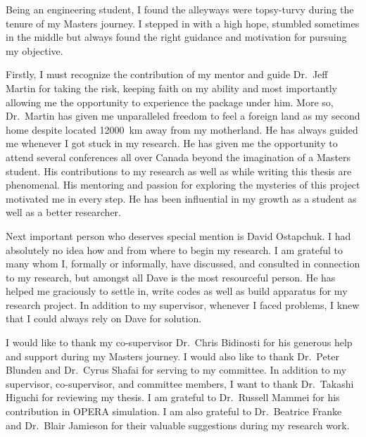 \newpage
\tableofcontents
{}
\listoffigures
\listoftables

\begin{acknowledgments}
\vspace{2em}

Being an engineering student, I found the alleyways were topsy-turvy during the tenure of my Masters journey. I stepped in with a high hope, stumbled sometimes in the middle but always found the right guidance and motivation for pursuing my objective. 

Firstly, I must recognize the contribution of my mentor and guide Dr.~Jeff Martin for taking the risk, keeping faith on my ability and most importantly allowing me the opportunity to experience the package under him. More so, Dr.~Martin has given me unparalleled freedom to feel a foreign land as my second home despite located 12000~km away from my motherland. He has always guided me whenever I got stuck in my research. He has given me the opportunity to attend several conferences all over Canada beyond the imagination of a Masters student. His contributions to my research as well as while writing this thesis are phenomenal. His mentoring and passion for exploring the mysteries of this project motivated me in every step. He has been influential in my growth as a student as well as a better researcher.  



Next important person who deserves special mention is David Ostapchuk. I had absolutely no idea how and from where to begin my research. I am grateful to many whom I, formally or informally, have discussed, and consulted in connection to my research, but amongst all Dave is the most resourceful person. He has helped me graciously to settle in, write codes as well as build apparatus for my research project. In addition to my supervisor, whenever I faced problems, I knew that I could always rely on Dave for solution.


I would like to thank my co-supervisor Dr.~Chris Bidinosti for his generous help and support during my Masters journey. I would also like to thank Dr.~Peter Blunden and Dr.~Cyrus Shafai for serving to my committee. In addition to my supervisor, co-supervisor, and committee members, I want to thank Dr.~Takashi Higuchi for reviewing my thesis. I am grateful to Dr.~Russell Mammei for his contribution in OPERA simulation. I am also grateful to Dr.~Beatrice Franke and Dr.~Blair Jamieson for their valuable suggestions during my research work. 



\end{acknowledgments}
